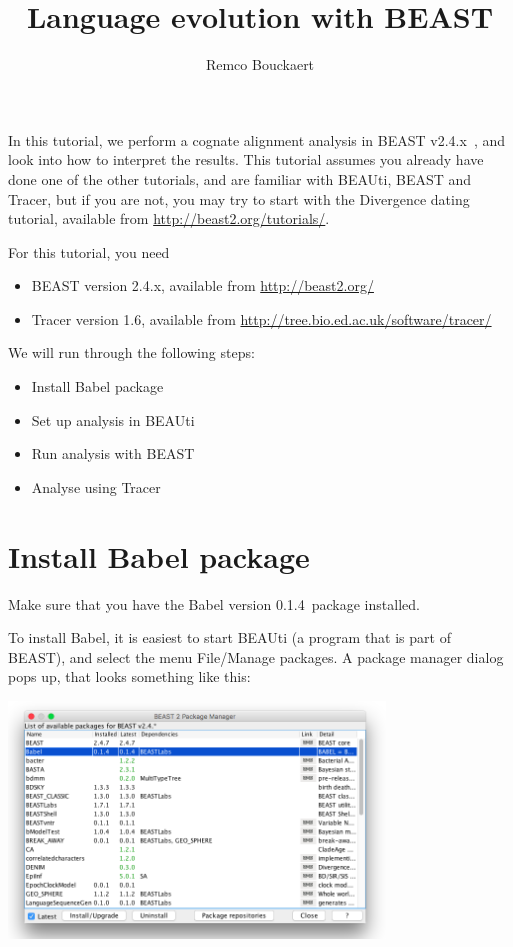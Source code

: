\documentclass{article}
\title{Language evolution with BEAST {\BEASTVersion}}
\author{Remco Bouckaert}
\newcommand{\BEASTVersion}{2.4.x}
\newcommand{\TracerVersion}{1.6}
\newcommand{\BabelVersion}{0.1.4}
\begin{document}
\maketitle


In this tutorial, we perform a cognate alignment analysis in BEAST v\BEASTVersion\ \cite{beast}, and look into how to interpret the results.
This tutorial assumes you already have done one of the other tutorials, and are familiar with BEAUti, BEAST and Tracer, but if you are not, you may try to start with the Divergence dating tutorial, available from \url{http://beast2.org/tutorials/}.

For this tutorial, you need
\begin{itemize}
\item BEAST version \BEASTVersion, available from \url{http://beast2.org/}
\item Tracer version \TracerVersion, available from \url{http://tree.bio.ed.ac.uk/software/tracer/}
\end{itemize}

We will run through the following steps:
\begin{itemize}
\item{Install Babel package}
\item{Set up analysis in BEAUti}
\item{Run analysis with BEAST}
\item{Analyse using Tracer}
\end{itemize}

\section*{Install Babel package}
Make sure that you have the Babel version \BabelVersion\ package installed. 

To install Babel, it is easiest to start BEAUti (a program that is part of BEAST), and select the menu File/Manage packages. A package manager dialog pops up, that looks something like this:

\begin{center}
\includegraphics[width=0.75\textwidth]{package_manager.png}
\end{center}
\end{document}
